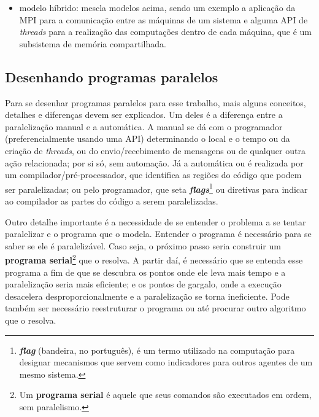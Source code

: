\begin{itemize}
            \item modelo híbrido: mescla modelos acima, sendo um exemplo a 
            aplicação da MPI para a comunicação entre as máquinas de um 
            sistema e alguma API de \textit{threads} para a realização das 
            computações dentro de cada máquina, que é um subsistema de 
            memória compartilhada.
            
        \end{itemize}
    
    \subsection{Desenhando programas paralelos}
    
	    \label{subsec:parallel-design}
	    
 	    Para se desenhar programas paralelos para esse trabalho, mais alguns 
 	    conceitos, detalhes e diferenças devem ser explicados. Um deles é a diferença 
 	    entre a paralelização manual e a automática. A manual 
 	    se dá com o programador (preferencialmente usando uma API) 
 	    determinando o local e o tempo ou da criação de \textit{threads}, ou
 	    do envio/recebimento de mensagens ou de qualquer outra ação 
 	    relacionada; por si só, sem automação. Já a automática ou é realizada 
 	    por um compilador/pré-processador, que identifica as regiões do 
 	    código que podem ser paralelizadas; ou pelo programador, que seta 
 	    \textbf{\textit{flags}}\footnote{\textbf{\textit{flag}} 
   		(bandeira, no português), é um termo utilizado na computação para 
   		designar mecanismos que servem como indicadores para outros agentes 
   		de um mesmo sistema.} ou diretivas para indicar ao compilador as 
    	partes do código a serem paralelizadas.
	    
	    Outro detalhe importante é a necessidade de se entender o problema a 
	    se tentar paralelizar e o programa que o modela. Entender o programa 
	    é necessário para se saber se ele é paralelizável. Caso seja, o 
	    próximo passo seria construir um \textbf{programa serial}\footnote{Um 
	    \textbf{programa serial} é aquele que seus comandos são executados 
	    em ordem, sem paralelismo.} que o resolva. A partir daí, é necessário 
		que se entenda esse programa a fim de que se descubra os pontos onde 
		ele leva mais tempo e a paralelização seria mais eficiente; e os 
		pontos de gargalo, onde a execução desacelera desproporcionalmente e a
		paralelização se torna ineficiente. Pode também ser necessário 
		reestruturar o programa ou até procurar outro algoritmo que o resolva.
		

